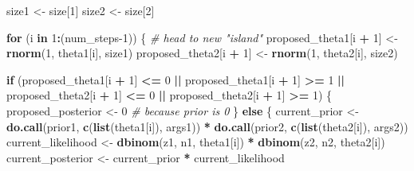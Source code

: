 \documentclass[
  12pt,
]{book}
\newenvironment{Shaded}{\begin{snugshade}}{\end{snugshade}}
\newcommand{\CommentTok}[1]{\textcolor[rgb]{0.56,0.35,0.01}{\textit{#1}}}
\newcommand{\ControlFlowTok}[1]{\textcolor[rgb]{0.13,0.29,0.53}{\textbf{#1}}}
\newcommand{\DecValTok}[1]{\textcolor[rgb]{0.00,0.00,0.81}{#1}}
\newcommand{\KeywordTok}[1]{\textcolor[rgb]{0.13,0.29,0.53}{\textbf{#1}}}
\newcommand{\NormalTok}[1]{#1}
\newcommand{\OperatorTok}[1]{\textcolor[rgb]{0.81,0.36,0.00}{\textbf{#1}}}
\newcommand{\StringTok}[1]{\textcolor[rgb]{0.31,0.60,0.02}{#1}}
\theoremstyle{definition}
\theoremstyle{definition}
\theoremstyle{definition}
\theoremstyle{remark}
\begin{document}
\begin{Shaded}
\begin{Highlighting}[]
\NormalTok{  size1 <-}\StringTok{ }\NormalTok{size[}\DecValTok{1}\NormalTok{] }
\NormalTok{  size2 <-}\StringTok{ }\NormalTok{size[}\DecValTok{2}\NormalTok{] }
  
  \ControlFlowTok{for}\NormalTok{ (i }\ControlFlowTok{in} \DecValTok{1}\OperatorTok{:}\NormalTok{(num_steps}\DecValTok{-1}\NormalTok{)) \{}
    \CommentTok{# head to new "island"}
\NormalTok{    proposed_theta1[i }\OperatorTok{+}\StringTok{ }\DecValTok{1}\NormalTok{] <-}\StringTok{ }\KeywordTok{rnorm}\NormalTok{(}\DecValTok{1}\NormalTok{, theta1[i], size1)}
\NormalTok{    proposed_theta2[i }\OperatorTok{+}\StringTok{ }\DecValTok{1}\NormalTok{] <-}\StringTok{ }\KeywordTok{rnorm}\NormalTok{(}\DecValTok{1}\NormalTok{, theta2[i], size2)}
    
    \ControlFlowTok{if}\NormalTok{ (proposed_theta1[i }\OperatorTok{+}\StringTok{ }\DecValTok{1}\NormalTok{] }\OperatorTok{<=}\StringTok{ }\DecValTok{0} \OperatorTok{||}
\StringTok{        }\NormalTok{proposed_theta1[i }\OperatorTok{+}\StringTok{ }\DecValTok{1}\NormalTok{] }\OperatorTok{>=}\StringTok{ }\DecValTok{1} \OperatorTok{||}
\StringTok{        }\NormalTok{proposed_theta2[i }\OperatorTok{+}\StringTok{ }\DecValTok{1}\NormalTok{] }\OperatorTok{<=}\StringTok{ }\DecValTok{0} \OperatorTok{||}
\StringTok{        }\NormalTok{proposed_theta2[i }\OperatorTok{+}\StringTok{ }\DecValTok{1}\NormalTok{] }\OperatorTok{>=}\StringTok{ }\DecValTok{1}\NormalTok{) \{}
\NormalTok{      proposed_posterior <-}\StringTok{ }\DecValTok{0}  \CommentTok{# because prior is 0}
\NormalTok{    \} }\ControlFlowTok{else}\NormalTok{ \{}
\NormalTok{      current_prior <-}\StringTok{ }
\StringTok{        }\KeywordTok{do.call}\NormalTok{(prior1, }\KeywordTok{c}\NormalTok{(}\KeywordTok{list}\NormalTok{(theta1[i]), args1)) }\OperatorTok{*}
\StringTok{        }\KeywordTok{do.call}\NormalTok{(prior2, }\KeywordTok{c}\NormalTok{(}\KeywordTok{list}\NormalTok{(theta2[i]), args2))}
\NormalTok{      current_likelihood  <-}\StringTok{ }
\StringTok{        }\KeywordTok{dbinom}\NormalTok{(z1, n1, theta1[i]) }\OperatorTok{*}
\StringTok{        }\KeywordTok{dbinom}\NormalTok{(z2, n2, theta2[i])}
\NormalTok{      current_posterior   <-}\StringTok{ }\NormalTok{current_prior }\OperatorTok{*}\StringTok{ }\NormalTok{current_likelihood}
      

\end{Highlighting}
\end{Shaded}
\end{document}
